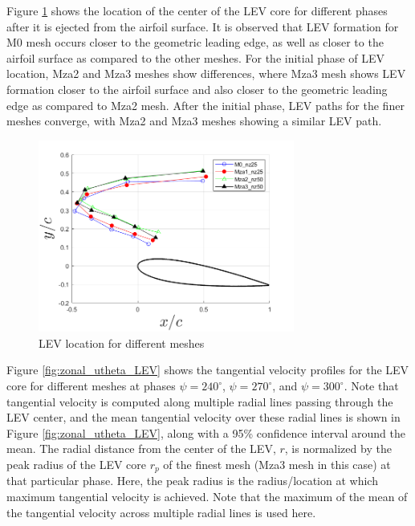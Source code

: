 Figure \ref{fig:zonal_LEV_location} shows the location of the center of the LEV core for different phases after it is ejected from the airfoil surface. 
It is observed that LEV formation for M0 mesh occurs closer to the geometric leading edge, as well as closer to the airfoil surface as compared to the other meshes.
For the initial phase of LEV location, Mza2 and Mza3 meshes show differences, where Mza3 mesh shows LEV formation closer to the airfoil surface and also closer to the geometric leading edge as compared to Mza2 mesh.
After the initial phase, LEV paths for the finer meshes converge, with Mza2 and Mza3 meshes showing a similar LEV path.


\begin{figure}[H]
	\centering
	\includegraphics[width=0.75\textwidth]{figures/zonal_adapt_results/LEV/LEV_location}
	\caption{ LEV location for different meshes}
	\label{fig:zonal_LEV_location}
\end{figure}

Figure \ref{fig:zonal_utheta_LEV} shows the tangential velocity profiles for the LEV core for different meshes at phases  $\psi = 240^\circ$,  $\psi = 270^\circ$, and  $\psi = 300^\circ$. 
Note that tangential velocity is computed along multiple radial lines passing through the LEV center, and the mean tangential velocity over these radial lines is shown in Figure \ref{fig:zonal_utheta_LEV}, along with a 95\% confidence interval around the mean.
The radial distance from the center of the LEV, $r$, is normalized by the peak radius of the LEV core $r_p$ of the finest mesh (Mza3 mesh in this case) at that particular phase. 
Here, the peak radius is the radius/location at which maximum tangential velocity is achieved. 
Note that the maximum of the mean of the tangential velocity across multiple radial lines is used here. 

